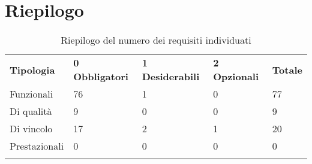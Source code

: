 \documentclass[AnalisiDeiRequisiti.tex]{subfiles}
\begin{document}
\newpage
\section{Riepilogo}

\label{table:Riepilogo del numero dei requisiti individuati}
\renewcommand*{\arraystretch}{1.2}
\begin{longtable}[H]{p{2.8cm}p{2.9cm}p{2.9cm}p{2.9cm}p{1.5cm}}
	\rowcolor{CHeader}
	\color{CHeaderText} \textbf{Tipologia} & \color{CHeaderText} \textbf{0 Obbligatori} & \color{CHeaderText} \textbf{1 Desiderabili} & \color{CHeaderText} \textbf{2 Opzionali} & \color{CHeaderText} \textbf{Totale} \\
	Funzionali & 76 & 1 & 0 & 77 \\
	Di qualità & 9 & 0 & 0 & 9 \\
	Di vincolo & 17 & 2 & 1 & 20 \\
	Prestazionali & 0 & 0 & 0 & 0 \\
	\hiderowcolors
	\caption{Riepilogo del numero dei requisiti individuati}
\end{longtable}
\end{document}
